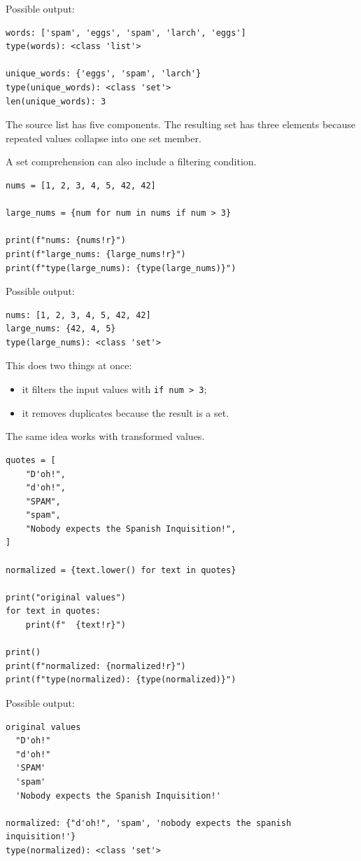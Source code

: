 Possible output:

\begin{verbatim}
words: ['spam', 'eggs', 'spam', 'larch', 'eggs']
type(words): <class 'list'>

unique_words: {'eggs', 'spam', 'larch'}
type(unique_words): <class 'set'>
len(unique_words): 3
\end{verbatim}

The source list has five components. The resulting set has three elements because repeated values collapse into one set member.

A set comprehension can also include a filtering condition.

\begin{verbatim}
nums = [1, 2, 3, 4, 5, 42, 42]

large_nums = {num for num in nums if num > 3}

print(f"nums: {nums!r}")
print(f"large_nums: {large_nums!r}")
print(f"type(large_nums): {type(large_nums)}")
\end{verbatim}

Possible output:

\begin{verbatim}
nums: [1, 2, 3, 4, 5, 42, 42]
large_nums: {42, 4, 5}
type(large_nums): <class 'set'>
\end{verbatim}

This does two things at once:

\begin{itemize}
    \item it filters the input values with \texttt{if num > 3};
    \item it removes duplicates because the result is a set.
\end{itemize}

The same idea works with transformed values.

\begin{verbatim}
quotes = [
    "D'oh!",
    "d'oh!",
    "SPAM",
    "spam",
    "Nobody expects the Spanish Inquisition!",
]

normalized = {text.lower() for text in quotes}

print("original values")
for text in quotes:
    print(f"  {text!r}")

print()
print(f"normalized: {normalized!r}")
print(f"type(normalized): {type(normalized)}")
\end{verbatim}

Possible output:

\begin{verbatim}
original values
  "D'oh!"
  "d'oh!"
  'SPAM'
  'spam'
  'Nobody expects the Spanish Inquisition!'

normalized: {"d'oh!", 'spam', 'nobody expects the spanish inquisition!'}
type(normalized): <class 'set'>
\end{verbatim}

